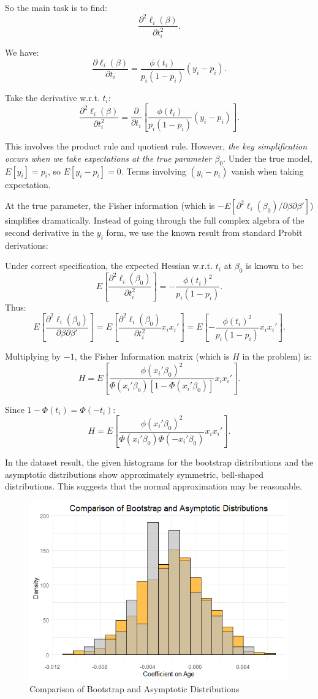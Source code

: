 \documentclass[a4paper,12pt]{article} %
\theoremstyle{nonitalic}
\newenvironment{solution}[1]
  {\renewcommand\theinnercustomsol{#1}\innercustomsol}
  {\endinnercustomsol}
\newcounter{solutionctr}[section]
\renewcommand{\thesolutionctr}{(\alph{solutionctr})}
\newenvironment{autosolution}
  {\stepcounter{solutionctr}\begin{solution}{\thesolutionctr}}
  {\end{solution}}
\begin{document}
\begin{autosolution}
    So the main task is to find:
    \[
    \frac{\partial^2 \ell_i(\beta)}{\partial t_i^2}.
    \]

    We have:
    \[
    \frac{\partial \ell_i(\beta)}{\partial t_i} = \frac{\phi(t_i)}{p_i(1-p_i)}(y_i - p_i).
    \]

    Take the derivative w.r.t. $t_i$:
    \[
    \frac{\partial^2 \ell_i(\beta)}{\partial t_i^2} 
    = \frac{\partial}{\partial t_i}\left[\frac{\phi(t_i)}{p_i(1-p_i)}(y_i - p_i)\right].
    \]

    This involves the product rule and quotient rule. However, \textit{the key simplification occurs when we take expectations at the true parameter $\beta_0$}. Under the true model, $E[y_i]=p_i$, so $E[y_i - p_i]=0$. Terms involving $(y_i - p_i)$ vanish when taking expectation.

    At the true parameter, the Fisher information (which is $-E[\partial^2 \ell_i(\beta_0)/\partial \beta \partial \beta']$) simplifies dramatically. Instead of going through the full complex algebra of the second derivative in the $y_i$ form, we use the known result from standard Probit derivations:

    Under correct specification, the expected Hessian w.r.t. $t_i$ at $\beta_0$ is known to be:
    \[
    E\left[\frac{\partial^2 \ell_i(\beta_0)}{\partial t_i^2}\right] = -\frac{\phi(t_i)^2}{p_i(1-p_i)}.
    \]
    Thus:
    \[
    E\left[\frac{\partial^2 \ell_i(\beta_0)}{\partial \beta \partial \beta'}\right] 
    = E\left[\frac{\partial^2 \ell_i(\beta_0)}{\partial t_i^2} x_i x_i'\right] 
    = E\left[-\frac{\phi(t_i)^2}{p_i(1-p_i)} x_i x_i'\right].
    \]

    Multiplying by $-1$, the Fisher Information matrix (which is $H$ in the problem) is:
    \[
    H = E\left[\frac{\phi(x_i'\beta_0)^2}{\Phi(x_i'\beta_0)[1-\Phi(x_i'\beta_0)]} x_i x_i'\right].
    \]

    Since $1-\Phi(t_i)=\Phi(-t_i)$:
    \[
    H = E\left[\frac{\phi(x_i'\beta_0)^2}{\Phi(x_i'\beta_0)\Phi(-x_i'\beta_0)} x_i x_i'\right].
    \]

    In the dataset result, the given histograms for the bootstrap distributions and the asymptotic distributions show approximately symmetric, bell-shaped distributions. 
    This suggests that the normal approximation may be reasonable.

    \begin{figure}[!htbp]
        \centering
        \includegraphics[width=0.5\linewidth]{h.png}
        \caption{Comparison of Bootstrap and Asymptotic Distributions}
        \label{fig:h}
    \end{figure}


\end{autosolution}
\end{document}
